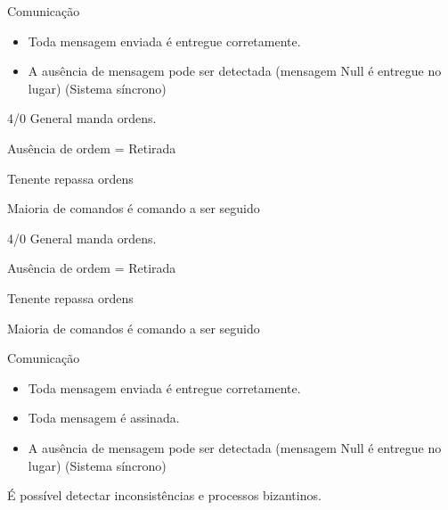 
\begin{frame}{Comunicação}
\begin{itemize}
	\item Toda mensagem enviada é entregue corretamente.
	\item A ausência de mensagem pode ser detectada (mensagem Null é entregue no lugar) (Sistema síncrono)
\end{itemize}
\end{frame}


\begin{frame}{4/0}
General manda ordens.

Ausência de ordem = Retirada

Tenente repassa ordens

Maioria de comandos é comando a ser seguido
\end{frame}


\begin{frame}{4/0}
General manda ordens.

Ausência de ordem = Retirada

Tenente repassa ordens

Maioria de comandos é comando a ser seguido
\end{frame}


\begin{frame}{Comunicação}
\begin{itemize}
	\item Toda mensagem enviada é entregue corretamente.
	\item Toda mensagem é assinada.
	\item A ausência de mensagem pode ser detectada (mensagem Null é entregue no lugar) (Sistema síncrono)
\end{itemize}

\pause É possível detectar inconsistências e processos bizantinos.
\end{frame}


